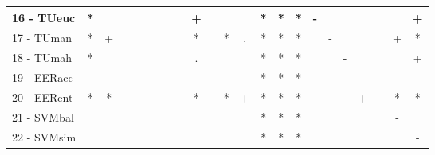 \begin{table}[h]
\begin{center}
\begin{tabular}{lcc|cc|cc|cc|cc|cc|cc|cc|cc|cc|cc}
16 - TUeuc	& * &   &   &   &   &   &   &   & + &   &   &   & * & * & * & - &   &   &   &   &   & + \\ \hline
17 - TUman	& * & + &   &   &   &   &   &   & * &   & * & . & * & * & * &   & - &   &   &   & + & * \\
18 - TUmah	& * &   &   &   &   &   &   &   & . &   &   &   & * & * & * &   &   & - &   &   &   & + \\ \hline
19 - EERacc	&   &   &   &   &   &   &   &   &   &   &   &   & * & * & * &   &   &   & - &   &   &   \\
20 - EERent	& * & * &   &   &   &   &   &   & * &   & * & + & * & * & * &   &   &   & + & - & * & * \\ \hline
21 - SVMbal	&   &   &   &   &   &   &   &   &   &   &   &   & * & * & * &   &   &   &   &   & - &   \\
22 - SVMsim	&   &   &   &   &   &   &   &   &   &   &   &   & * & * & * &   &   &   &   &   &   & - \\ \hline\end{tabular}

\label{stratsfriedC4.5w}
\end{center}
\end{table}